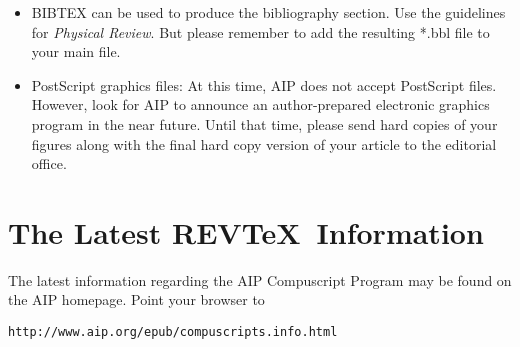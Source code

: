 \begin{itemize}

\item
BIBTEX can be used to produce the bibliography section.  Use the guidelines
for {\em Physical Review}. But please remember to add the resulting
*.bbl file to your main file.

\item  PostScript graphics files: At this time, AIP does not
accept PostScript files. However, look for AIP to announce an
author-prepared electronic graphics program in the near future. Until  
that time, please send hard copies of your figures along with the
final hard copy version of your article to the editorial office.

\end{itemize}

\section{The Latest REV\TeX\ Information}

The latest information regarding the AIP Compuscript Program
may be found on the AIP homepage. Point your browser to
\begin{center}
\begin{verbatim}
http://www.aip.org/epub/compuscripts.info.html
\end{verbatim}
\end{center}






